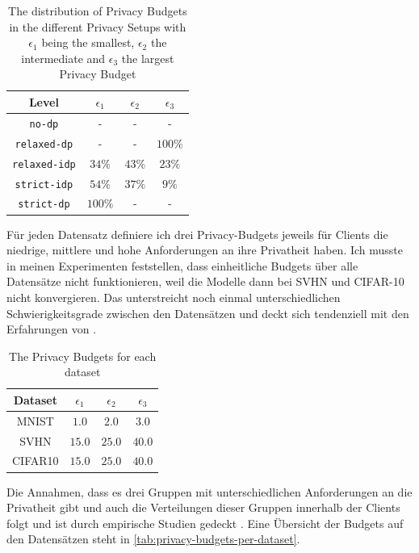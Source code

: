 \begin{table}[tb]
	\centering
	\begin{tabular}{|c|c|c|c|}
		\hline
		Level & $\epsilon_1$ & $\epsilon_2$ & $\epsilon_3$ \\
		\hline
		\texttt{no-dp} & - & - & - \\
		\texttt{relaxed-dp} & - & - & $100\%$ \\
		\texttt{relaxed-idp} & $34\%$ & $43\%$ & $23\%$ \\
		\texttt{strict-idp} & $54\%$ & $37\%$ & $9\%$ \\
		\texttt{strict-dp} & $100\%$ & - & - \\
		\hline
	\end{tabular}
	\caption{The distribution of Privacy Budgets in the different Privacy Setups with $\epsilon_1$ being the smallest, $\epsilon_2$ the intermediate and $\epsilon_3$ the largest Privacy Budget}
	\label{tab:privacy-niveau-distribution}
\end{table}

Für jeden Datensatz definiere ich drei Privacy-Budgets jeweils für Clients die niedrige, mittlere und hohe Anforderungen an ihre Privatheit haben. Ich musste in meinen Experimenten feststellen, dass einheitliche Budgets über alle Datensätze nicht funktionieren, weil die Modelle dann bei SVHN und CIFAR-10 nicht konvergieren. Das unterstreicht noch einmal unterschiedlichen Schwierigkeitsgrade zwischen den Datensätzen und deckt sich tendenziell mit den Erfahrungen von \textcite{sun:2021}.

\begin{table}[tb]
	\centering
	\begin{tabular}{|c|c|c|c|}
		\hline
		Dataset & $\epsilon_1$ & $\epsilon_2$ & $\epsilon_3$ \\
		\hline
		MNIST & $1.0$ & $2.0$ & $3.0$ \\
		SVHN & $15.0$ & $25.0$ & $40.0$ \\
		CIFAR10 & $15.0$ & $25.0$ & $40.0$ \\
		\hline
	\end{tabular}
	\caption{The Privacy Budgets for each dataset}
	\label{tab:privacy-budgets-per-dataset}
\end{table}

Die Annahmen, dass es drei Gruppen mit unterschiedlichen Anforderungen an die Privatheit gibt und auch die Verteilungen dieser Gruppen innerhalb der Clients folgt \textcite{boenisch:2023} und ist durch empirische Studien gedeckt \cite{jensen:2005, acquisti:2005}. Eine Übersicht der Budgets auf den Datensätzen steht in \autoref{tab:privacy-budgets-per-dataset}.

